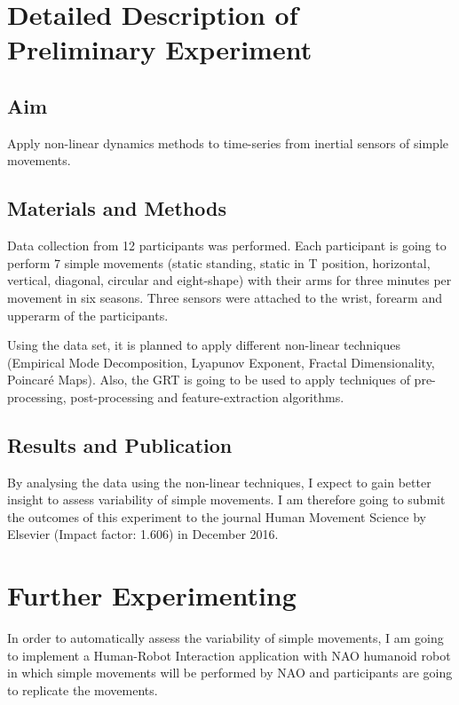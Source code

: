 \documentclass[9pt,journal,onecolumn,compsoc]{IEEEtran}
\begin{document}
 
\section{Detailed Description of Preliminary Experiment}

\subsection{Aim}
Apply non-linear dynamics methods to time-series from inertial sensors of 
simple movements.

\subsection{Materials and Methods}
Data collection from 12 participants was performed. 
Each participant is going to 
perform 7 simple movements (static standing, static in T position, horizontal,
vertical, diagonal, circular and eight-shape) with their arms for three minutes per movement
in six seasons.
Three sensors were attached to the wrist, forearm and upperarm of the participants.

Using the data set, it is planned to apply different non-linear techniques 
(Empirical Mode Decomposition, Lyapunov Exponent, Fractal Dimensionality, Poincar\'e Maps).
Also, the GRT is going to be used to apply techniques of 
pre-processing, post-processing and feature-extraction algorithms.

\subsection{Results and Publication}
By analysing the data using the non-linear techniques, I expect to
gain better insight to assess variability of simple movements.
I am therefore going to submit the outcomes of this experiment to
the journal Human Movement Science by Elsevier (Impact factor: 1.606) in December 2016.


\section{Further Experimenting}

In order to automatically assess the variability of simple movements, 
I am going to implement a Human-Robot Interaction application 
with NAO humanoid robot \cite{NAO}
in which simple movements will be performed by NAO 
and participants are going to replicate the movements.


\ifCLASSOPTIONcompsoc
\end{document}
